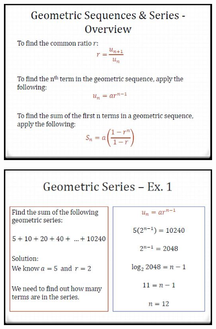 \documentclass{beamer}
\begin{document}
\begin{frame}
	\begin{figure}
		\centering
		\includegraphics[width=0.99\linewidth]{SeqSer19C}
	\end{figure}
	
\end{frame}	
\begin{frame}
	\begin{figure}
		\centering
		\includegraphics[width=0.99\linewidth]{SeqSer19D}
	\end{figure}
	
\end{frame}
\end{document}
